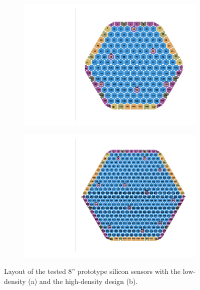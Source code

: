 \begin{figure}
	\captionsetup[subfigure]{aboveskip=-1pt,belowskip=-1pt}
	\centering
	\begin{subfigure}[b]{0.50\textwidth}
		\includegraphics[width=0.999\textwidth]{plots/ch_mapping/LD.pdf}
		\subcaption{
		}
	\end{subfigure}
	\hfill
	\begin{subfigure}[b]{0.48\textwidth}
		\includegraphics[width=0.999\textwidth]{plots/ch_mapping/HD.pdf}
		\subcaption{
		}
	\end{subfigure}    
	\caption{
        Layout of the tested 8'' prototype silicon sensors with the low-density (a) and the high-density design (b).
	}
	\label{fig:Sensors}
\end{figure}


